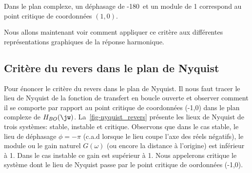 Dans le plan complexe, un  déphasage de -180\degree~et un module de 1 
correspond au point critique de coordonnées $(1,0)$.

Nous allons maintenant voir comment appliquer ce critère aux différentes 
représentations graphiques de la réponse harmonique.

\newpage
\subsection{Critère du revers dans le plan de Nyquist}

Pour énoncer le critère du revers dans le plan de Nyquist. Il nous faut tracer
le lieu de Nyquist de la fonction de transfert en boucle ouverte et observer 
comment il se comporte par rapport au point critique de coordonnées (-1,0) 
dans le plan complexe de $H_{BO}(\jw)$. La~\cref{fig-nyquist_revers} présente 
les lieux de Nyquist de trois systèmes: stable, instable et critique. Observons
que dans le cas stable, le lieu de déphasage $\phi=-\pi$ (c.a.d lorsque le lieu
coupe l'axe des réels négatifs), le module ou le gain naturel $G(\omega)$ (ou 
encore la distance à l'origine) est inférieur à 1. Dans le cas instable ce gain 
est supérieur à 1. Nous appelerons critique le système dont le lieu de Nyquist 
passe par le point critique de oordonnées (-1,0).

